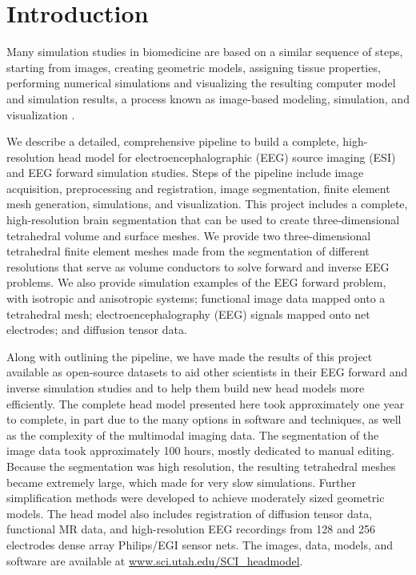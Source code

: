 
\section{Introduction}
\label{sec:intro}

Many simulation studies in biomedicine are based on a similar sequence of steps, starting from images, creating geometric models, assigning tissue properties, performing numerical simulations and visualizing the resulting computer model and simulation results, a process known as image-based modeling, simulation, and visualization \cite{SCI:Mac2009a,SCI:Joh2015c,SCI:Joh2012a,SCI:Joh2006a,SCI:Joh2004b}.

We describe a detailed, comprehensive pipeline to build a complete, high-resolution head model for electroencephalographic (EEG) source imaging (ESI) and EEG forward simulation studies.  Steps of the pipeline include image acquisition, preprocessing and registration, image segmentation, finite element mesh generation, simulations, and visualization. This project includes a complete, high-resolution brain segmentation that can be used to create three-dimensional tetrahedral volume and surface meshes. We provide two three-dimensional tetrahedral finite element meshes made from the segmentation of different resolutions that serve as volume conductors to solve forward and inverse EEG problems. We also provide simulation examples of the EEG forward problem, with isotropic and anisotropic systems; functional image data mapped onto a tetrahedral mesh; electroencephalography (EEG) signals mapped onto net electrodes; and diffusion tensor data.

Along with outlining the pipeline, we have made the results of this project available as open-source datasets to aid other scientists in their EEG forward and inverse simulation studies and to help them build new head models more efficiently. The complete head model presented here took approximately one year to complete, in part due to the many options in software and techniques, as well as the complexity of the multimodal imaging data. The segmentation of the image data took approximately 100 hours, mostly dedicated to manual editing. Because the segmentation was high resolution, the resulting tetrahedral meshes became extremely large, which made for very slow simulations. Further simplification methods were developed to achieve moderately sized geometric models.  The head model also includes registration of diffusion tensor data, functional MR data, and high-resolution EEG recordings from 128 and 256 electrodes dense array Philips/EGI sensor nets. The images, data, models, and software are
available at \url{www.sci.utah.edu/SCI_headmodel}.